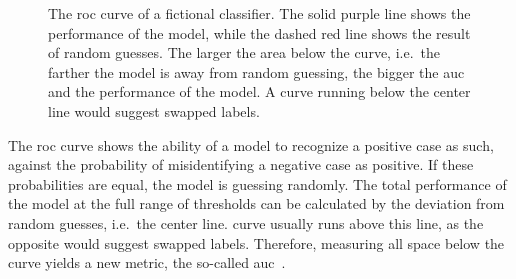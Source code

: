 \newcommand{\roccolor}{purple}
\begin{figure}[H]
    \centering

\caption{The \ac{roc} curve of a fictional classifier. The solid \roccolor{} line shows the performance of the model, while the dashed red line shows the result of random guesses. The larger the area below the curve, i.e.~the farther the model is away from random guessing, the bigger the \acs{auc} and the performance of the model. A curve running below the center line would suggest swapped labels.}\label{fig:roc}
\end{figure}


The \ac{roc} curve shows the ability of a model to recognize a positive case as
such, against the probability of misidentifying a negative case as positive.
If these probabilities are equal, the model is guessing randomly. The total 
performance of the model at the full range of thresholds can be calculated by
the deviation from random guesses, i.e.~the center line.  curve 
usually runs above this line, as the opposite would suggest swapped labels. 
Therefore, measuring all space below the curve yields a new metric, the 
so-called \acf{auc}~\cite{evaluating_learning_algorithms,fundamentals_of_machine_learning}.
